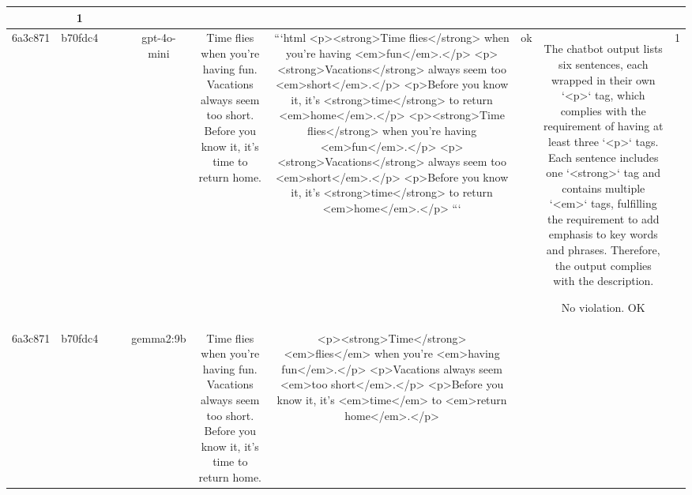 \begin{table}[h!]
\begin{tabular}{|c|c|c|c|c|c|c|c|c|c|}
{{1. The output contains more than three `<p>` tags. While the description specifies that there should be at least three `<p>` tags, there is no mention that duplication of content is required, which seems to be the case here as multiple sections of the text are repeated verbatim.

2. The third `<p>` tag presents formatting issues: There are errors in the usage of the `<em>` tags, such as `<em-with>` and `<em;larger>`, which are neither valid HTML tags nor comply with the requirements. Also, these tag names are malformed and do not reflect the usage of the `<em>` tag as described.

3. The fourth `<p>` tag similarly contains formatting issues with the `<em-with>` tag which is incorrect and does not comply with HTML standards.

4. Despite being a requirement to have sentences wrapped in `<p>` tags, there is a repetition of whole paragraphs, which could indicate that the input was not split into distinct sentences as intended, and instead repeated the same text across multiple paragraphs.

In summary, the chatbot's output does not comply with the description on several counts, including the incorrect format of the `<em>` tags and the repetition of output text that appears unnecessary with respect to splitting the input correctly into sentences.

ERR & 1\\
\hline
6a3c871 & b70fdc4 &  &  & gpt-4o-mini & Time flies when you're having fun. Vacations always seem too short. Before you know it, it's time to return home. & ```html
<p><strong>Time flies</strong> when you're having <em>fun</em>.</p>
<p><strong>Vacations</strong> always seem too <em>short</em>.</p>
<p>Before you know it, it's <strong>time</strong> to return <em>home</em>.</p>
<p><strong>Time flies</strong> when you're having <em>fun</em>.</p>
<p><strong>Vacations</strong> always seem too <em>short</em>.</p>
<p>Before you know it, it's <strong>time</strong> to return <em>home</em>.</p>
``` & ok & The chatbot output lists six sentences, each wrapped in their own `<p>` tag, which complies with the requirement of having at least three `<p>` tags. Each sentence includes one `<strong>` tag and contains multiple `<em>` tags, fulfilling the requirement to add emphasis to key words and phrases. Therefore, the output complies with the description.

No violation.
OK & 1\\
\hline
6a3c871 & b70fdc4 &  &  & gemma2:9b & Time flies when you're having fun. Vacations always seem too short. Before you know it, it's time to return home. & <p><strong>Time</strong> <em>flies</em> when you're <em>having fun</em>.</p>
<p>Vacations always seem <em>too short</em>.</p>
<p>Before you know it, it's <em>time</em> to <em>return home</em>.</p>  


}}
\end{tabular}
\end{table}
